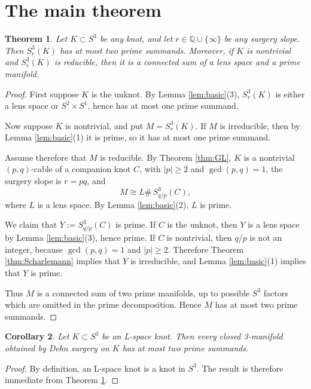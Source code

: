 \documentclass[11pt]{article}
\theoremstyle{plain}
\newtheorem{theorem}{Theorem}[section]
\newtheorem{corollary}[theorem]{Corollary}
\theoremstyle{definition}
\numberwithin{equation}{section}
\begin{document}
\section{The main theorem}

\begin{theorem}\label{thm:all-knots}
Let $K\subset S^3$ be any knot, and let $r\in \mathbb Q\cup\{\infty\}$ be any surgery slope.  Then $S^3_r(K)$ has at most two prime summands.  Moreover, if $K$ is nontrivial and $S^3_r(K)$ is reducible, then it is a connected sum of a lens space and a prime manifold.
\end{theorem}

\begin{proof}
First suppose $K$ is the unknot.  By Lemma \ref{lem:basic}(3), $S^3_r(K)$ is either a lens space or $S^2\times S^1$, hence has at most one prime summand.

Now suppose $K$ is nontrivial, and put $M=S^3_r(K)$.  If $M$ is irreducible, then by Lemma \ref{lem:basic}(1) it is prime, so it has at most one prime summand.

Assume therefore that $M$ is reducible.  By Theorem \ref{thm:GL}, $K$ is a nontrivial $(p,q)$-cable of a companion knot $C$, with $|p|\ge 2$ and $\gcd(p,q)=1$, the surgery slope is $r=pq$, and
\[
M\cong L\#\, S^3_{q/p}(C),
\]
where $L$ is a lens space.  By Lemma \ref{lem:basic}(2), $L$ is prime.

We claim that $Y:=S^3_{q/p}(C)$ is prime.  If $C$ is the unknot, then $Y$ is a lens space by Lemma \ref{lem:basic}(3), hence prime.  If $C$ is nontrivial, then $q/p$ is not an integer, because $\gcd(p,q)=1$ and $|p|\ge 2$.  Therefore Theorem \ref{thm:Scharlemann} implies that $Y$ is irreducible, and Lemma \ref{lem:basic}(1) implies that $Y$ is prime.

Thus $M$ is a connected sum of two prime manifolds, up to possible $S^3$ factors which are omitted in the prime decomposition.  Hence $M$ has at most two prime summands.
\end{proof}

\begin{corollary}\label{cor:L-space-knot}
Let $K\subset S^3$ be an L-space knot.  Then every closed 3-manifold obtained by Dehn surgery on $K$ has at most two prime summands.
\end{corollary}

\begin{proof}
By definition, an L-space knot is a knot in $S^3$.  The result is therefore immediate from Theorem \ref{thm:all-knots}.
\end{proof}
\end{document}
